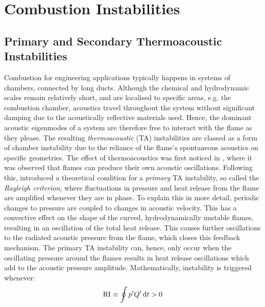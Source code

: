 \section{Combustion Instabilities}

\subsection{Primary and Secondary Thermoacoustic Instabilities}

Combustion for engineering applications typically happens in systems of chambers, connected by long ducts. Although the chemical and hydrodynamic scales remain relatively short, and are localised to specific areas, e.g. the combustion chamber, acoustics travel throughout the system without significant damping due to the acoustically reflective materials used. Hence, the dominant acoustic eigenmodes of a system are therefore free to interact with the flame as they please. The resulting \emph{thermoacoustic} (TA) instabilities are classed as a form of chamber instability due to the reliance of the flame's spontaneous acoustics on specific geometries. The effect of thermoacoustics was first noticed in \cite{mallard1883RecherchesExperimentalesTheoriques}, where it was observed that flames can produce their own acoustic oscillations. Following this, \cite{rayleigh1896TheorySound} introduced a theoretical condition for a \emph{primary} TA instability, so called the \emph{Rayleigh criterion}, where fluctuations in pressure and heat release from the flame are amplified whenever they are in phase. To explain this in more detail, periodic changes to pressure are coupled to changes in acoustic velocity. This has a convective effect on the shape of the curved, hydrodynamically unstable \cite{darrieus1945PropagationDunFront,landau1944TheorySlowCombustion,matalon2018DarrieusLandauInstability} flames, resulting in an oscillation of the total heat release. This causes further oscillations to the radiated acoustic pressure from the flame, which closes this feedback mechanism. The primary TA instability can, hence, only occur when the oscillating pressure around the flames results in heat release oscillations which add to the acoustic pressure amplitude. Mathematically, instability is triggered whenever:
\begin{equation}
\mathrm{RI} \equiv \oint p' Q' \dd{t} > 0
\end{equation}

